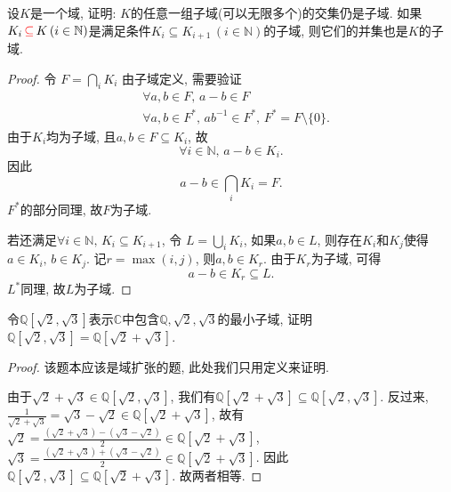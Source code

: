 \begin{problem}
    设$K$是一个域, 证明: $K$的任意一组子域(可以无限多个)的交集仍是子域. 如果$K_i \,\textcolor{red}{\subseteq}\, K \, (i \in \mathbb{N})$是满足条件$K_i \subseteq K_{i+1} \, (i \in \mathbb{N})$的子域, 则它们的并集也是$K$的子域.
\end{problem}

\begin{proof}
    令
    \(
        F = \bigcap_i K_i
    \)
    由子域定义, 需要验证
    \[
    \begin{aligned}
        &\forall a, b \in F ,\, a - b \in F\\
        &\forall a, b \in F^* ,\, ab^{-1} \in F^*,\, F^* = F \setminus \{0\}.
    \end{aligned}
    \]
    由于$K_i$均为子域, 且$a, b \in F \subseteq K_i$, 故
    \[
        \forall i \in \mathbb{N}, \, a - b \in K_i.
    \]
    因此
    \[
        a - b \in \bigcap_i K_i = F.
    \]
    $F^*$的部分同理, 故$F$为子域.
    
    若还满足$\forall i \in \mathbb{N} ,\, K_i \subseteq K_{i + 1}$, 令
    \(
        L = \bigcup_i K_i
    \),
    如果$a, b \in L$, 则存在$K_i$和$K_j$使得$a \in K_i ,\, b \in K_j$. 记$r = \max(i, j)$, 则$a, b \in K_r$. 由于$K_r$为子域, 可得
    \[
        a - b \in K_r \subseteq L.
    \]
    $L^*$同理, 故$L$为子域.
\end{proof}

\begin{problem}
    令$\mathbb{Q}[\sqrt{2}, \sqrt{3}]$表示$\mathbb{C}$中包含$\mathbb{Q}, \sqrt{2}, \sqrt{3}$的最小子域, 证明$\mathbb{Q}[\sqrt{2}, \sqrt{3}] = \mathbb{Q}[\sqrt{2} + \sqrt{3}]$.
\end{problem}

\begin{proof}
    该题本应该是域扩张的题, 此处我们只用定义来证明.

    由于$\sqrt{2} + \sqrt{3} \in \mathbb{Q}[\sqrt{2}, \sqrt{3}]$, 我们有$\mathbb{Q}[\sqrt{2} + \sqrt{3}] \subseteq \mathbb{Q}[\sqrt{2}, \sqrt{3}]$. 反过来,
    \(
        \frac{1}{\sqrt{2} + \sqrt{3}} = \sqrt{3} - \sqrt{2} \in \mathbb{Q}[\sqrt{2} + \sqrt{3}]
    \),
    故有
    \(
        \sqrt{2} = \frac{(\sqrt{2} + \sqrt{3}) - (\sqrt{3} - \sqrt{2})}{2} \in \mathbb{Q}[\sqrt{2} + \sqrt{3}]
    \),
    \(
        \sqrt{3} = \frac{(\sqrt{2} + \sqrt{3}) + (\sqrt{3} - \sqrt{2})}{2} \in \mathbb{Q}[\sqrt{2} + \sqrt{3}]
    \).
    因此
    \(
        \mathbb{Q}[\sqrt{2}, \sqrt{3}] \subseteq \mathbb{Q}[\sqrt{2} + \sqrt{3}]
    \).
    故两者相等.
\end{proof}

